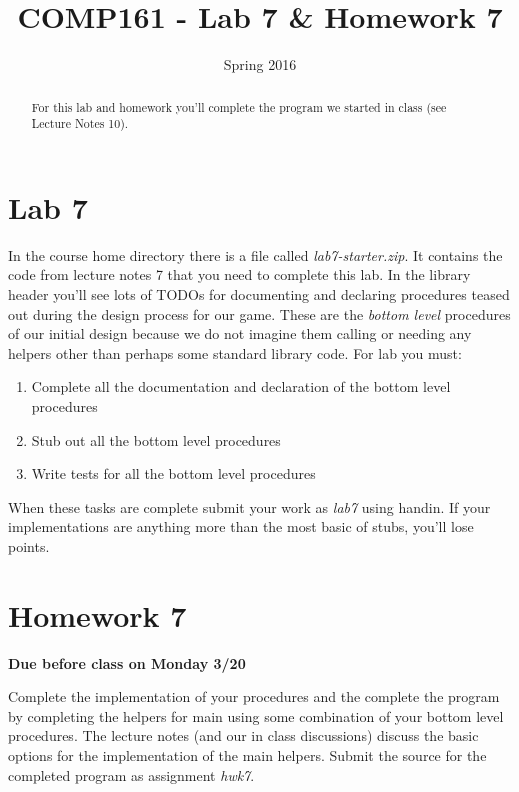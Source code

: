 \documentclass[nobib]{tufte-handout}
\title{COMP161 - Lab 7 \& Homework 7}
\author{}
\date{Spring 2016}
\begin{document}
\maketitle

\begin{abstract}
For this lab and homework you'll complete the program we started in class (see Lecture Notes 10).
\end{abstract}

\section{Lab 7}

In the course home directory there is a file called \textit{lab7-starter.zip}. It contains the code from lecture notes 7 that you need to complete this lab. In the library header you'll see lots of TODOs for documenting and declaring procedures teased out during the design process for our game. These are the \textit{bottom level} procedures of our initial design because we do not imagine them calling or needing any helpers other than perhaps some standard library code. For lab you must:
\begin{enumerate}
\item Complete all the documentation and declaration of the bottom level procedures
\item Stub out all the bottom level procedures
\item Write tests for all the bottom level procedures
\end{enumerate}
When these tasks are complete submit your work as \textit{lab7} using handin. If your implementations are anything more than the most basic of stubs, you'll lose points.

\section{Homework 7}

\begin{center}
\textbf{Due before class on Monday 3/20}
\end{center}

Complete the implementation of your procedures and the complete the program by completing the helpers for main using some combination of your bottom level procedures. The lecture notes (and our in class discussions) discuss the basic options for the implementation of the main helpers. Submit the source for the completed program as assignment \textit{hwk7}.
\end{document}
